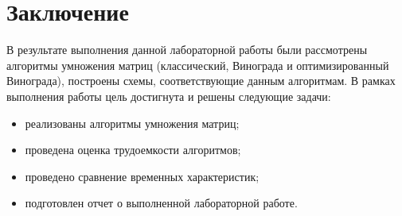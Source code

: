 \chapter*{Заключение}

В результате выполнения данной лабораторной работы были рассмотрены алгоритмы умножения матриц (классический, Винограда и оптимизированный Винограда), построены схемы, соответствующие данным алгоритмам.
В рамках выполнения работы цель достигнута и решены следующие задачи:
\begin{itemize}
	\item реализованы алгоритмы умножения матриц;
	\item проведена оценка трудоемкости алгоритмов;
	\item проведено сравнение временных характеристик;
	\item подготовлен отчет о выполненной лабораторной работе.
\end{itemize}


